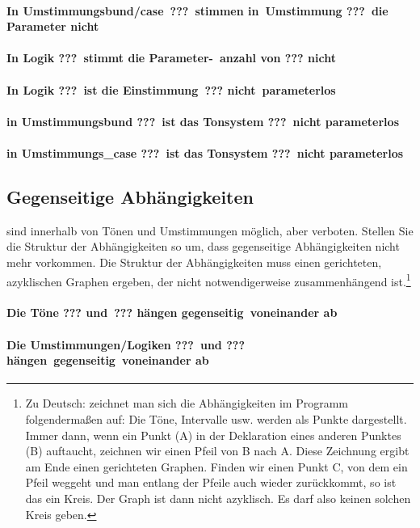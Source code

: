 \paragraph{In Umstimmungsbund/case\ ???\ stimmen in\ Umstimmung ???\ die Parameter nicht}
\paragraph{In Logik ???\ stimmt die Parameter-\ anzahl von ??? nicht}
\paragraph{In Logik ???\ ist die Einstimmung\ ??? nicht\ parameterlos}
\paragraph{in Umstimmungsbund ???\ ist das Tonsystem ???\ nicht parameterlos}
\paragraph{in Umstimmungs\_case ???\ ist das Tonsystem ???\ nicht parameterlos}
	 
\subsection{Gegenseitige Abhängigkeiten}\label{sec:gegens-abhang}
sind innerhalb von Tönen und Umstimmungen möglich, aber verboten.
Stellen Sie die Struktur der Abhängigkeiten so um, dass gegenseitige
Abhängigkeiten nicht mehr vorkommen. Die Struktur der Abhängigkeiten
muss einen gerichteten, azyklischen Graphen ergeben, der nicht
notwendigerweise zusammenhängend ist.\footnote{Zu Deutsch: zeichnet
  man sich die Abhängigkeiten im Programm folgendermaßen auf: Die
  Töne, Intervalle usw. werden als Punkte dargestellt. Immer dann,
  wenn ein Punkt (A) in der Deklaration eines anderen Punktes (B)
  auftaucht, zeichnen wir einen Pfeil von B nach A. Diese Zeichnung
  ergibt am Ende einen gerichteten Graphen. Finden wir einen Punkt C,
  von dem ein Pfeil weggeht und man entlang der Pfeile auch wieder
  zurückkommt, so ist das ein Kreis. Der Graph ist dann nicht
  azyklisch. Es darf also keinen solchen Kreis geben.}

\paragraph{Die Töne ??? und\ ??? hängen gegenseitig\ voneinander ab}
\paragraph{Die Umstimmungen/Logiken ???\ und ??? hängen\ gegenseitig\ voneinander ab}
